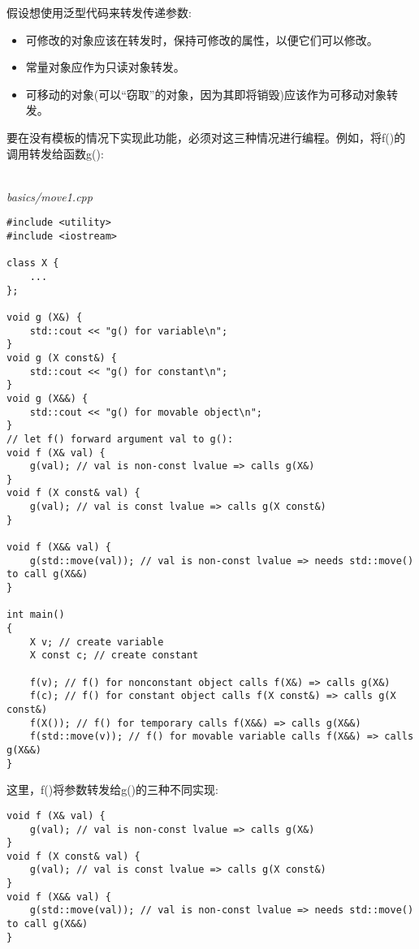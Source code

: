 假设想使用泛型代码来转发传递参数:

\begin{itemize}
\item 
可修改的对象应该在转发时，保持可修改的属性，以便它们可以修改。

\item 
常量对象应作为只读对象转发。

\item 
可移动的对象(可以“窃取”的对象，因为其即将销毁)应该作为可移动对象转发。
\end{itemize}

要在没有模板的情况下实现此功能，必须对这三种情况进行编程。例如，将f()的调用转发给函数g():

\hspace*{\fill} \\ %
\noindent
\textit{basics/move1.cpp}
\begin{lstlisting}[style=styleCXX]
#include <utility>
#include <iostream>

class X {
	...
};

void g (X&) {
	std::cout << "g() for variable\n";
}
void g (X const&) {
	std::cout << "g() for constant\n";
}
void g (X&&) {
	std::cout << "g() for movable object\n";
}
// let f() forward argument val to g():
void f (X& val) {
	g(val); // val is non-const lvalue => calls g(X&)
}
void f (X const& val) {
	g(val); // val is const lvalue => calls g(X const&)
}

void f (X&& val) {
	g(std::move(val)); // val is non-const lvalue => needs std::move() to call g(X&&)
}

int main()
{
	X v; // create variable
	X const c; // create constant
	
	f(v); // f() for nonconstant object calls f(X&) => calls g(X&)
	f(c); // f() for constant object calls f(X const&) => calls g(X const&)
	f(X()); // f() for temporary calls f(X&&) => calls g(X&&)
	f(std::move(v)); // f() for movable variable calls f(X&&) => calls g(X&&)
}
\end{lstlisting}

这里，f()将参数转发给g()的三种不同实现:

\begin{lstlisting}[style=styleCXX]
void f (X& val) {
	g(val); // val is non-const lvalue => calls g(X&)
}
void f (X const& val) {
	g(val); // val is const lvalue => calls g(X const&)
}
void f (X&& val) {
	g(std::move(val)); // val is non-const lvalue => needs std::move() to call g(X&&)
}
\end{lstlisting}

